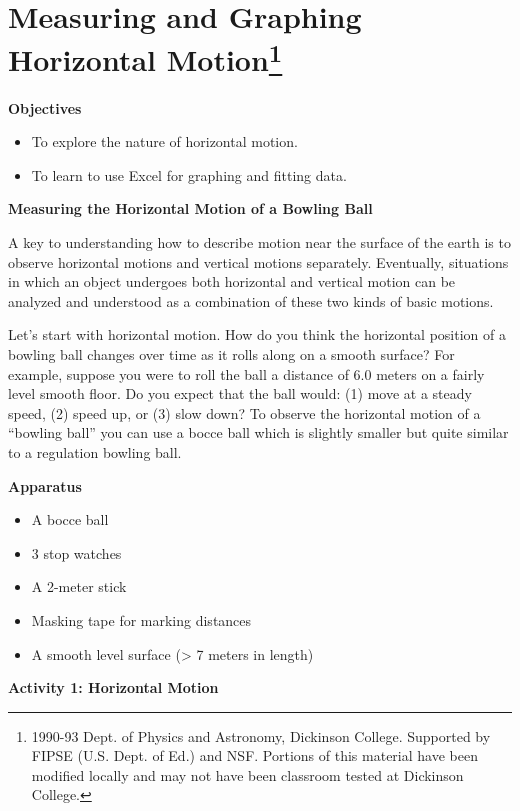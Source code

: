 
\section{Measuring and Graphing Horizontal Motion\footnote{
1990-93 Dept. of Physics and Astronomy, Dickinson College. Supported by FIPSE
(U.S. Dept. of Ed.) and NSF. Portions of this material have been modified locally
and may not have been classroom tested at Dickinson College.
}}

\makelabheader %

\textbf{Objectives} 

\begin{itemize} 
\setlength\itemsep{-4pt}
\setlength\topsep{-6pt}
\setlength\partopsep{-6pt}
\vspace{-0.1in}  %
\item To explore the nature of horizontal motion. 
\item To learn to use Excel for graphing and fitting data.
\end{itemize}
\textbf{Measuring the Horizontal Motion of a Bowling Ball} 

A key to understanding how to describe motion near the surface of the earth
is to observe horizontal motions and vertical motions separately. Eventually,
situations in which an object undergoes both horizontal and vertical motion
can be analyzed and understood as a combination of these two kinds of basic
motions.

Let's start with horizontal motion. How do you think the horizontal position
of a bowling ball changes over time as it rolls along on a smooth surface? For
example, suppose you were to roll the ball a distance of 6.0 meters on a fairly
level smooth floor. Do you expect that the ball would: (1) move at a steady
speed, (2) speed up, or (3) slow down? To observe the horizontal motion of a
``bowling ball'' you can use a bocce ball which is slightly
smaller but quite similar to a regulation bowling ball.

\textbf{Apparatus} 

\begin{itemize}\itemsep1pt
\setlength\itemsep{-4pt}
\setlength\topsep{-6pt}
\setlength\partopsep{-6pt}
\vspace{-0.1in}  %
\item A bocce ball 
\item 3 stop watches 
\item A 2-meter stick 
\item Masking tape for marking distances 
\item A smooth level surface (> 7 meters in length)
\end{itemize}
\textbf{Activity 1: Horizontal Motion }

